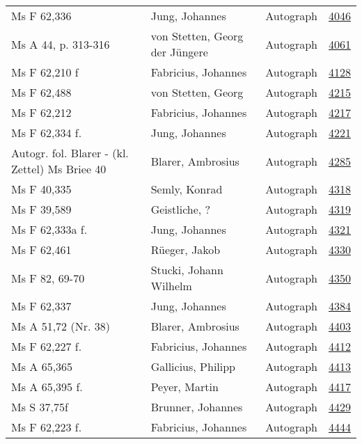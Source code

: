 \documentclass[10pt,a4paper,landscape]{report}
\begin{document}
\begin{longtable}{p{16cm}p{4cm}lr}
Ms F 62,336	&	Jung, Johannes	&	Autograph	&	\href{http://130.60.24.72/assignment/4046}{4046}\\
Ms A 44, p. 313-316	&	von Stetten, Georg der Jüngere	&	Autograph	&	\href{http://130.60.24.72/assignment/4061}{4061}\\
Ms F 62,210 f	&	Fabricius, Johannes	&	Autograph	&	\href{http://130.60.24.72/assignment/4128}{4128}\\
Ms F 62,488	&	von Stetten, Georg	&	Autograph	&	\href{http://130.60.24.72/assignment/4215}{4215}\\
Ms F 62,212	&	Fabricius, Johannes	&	Autograph	&	\href{http://130.60.24.72/assignment/4217}{4217}\\
Ms F 62,334 f.	&	Jung, Johannes	&	Autograph	&	\href{http://130.60.24.72/assignment/4221}{4221}\\
Autogr. fol. Blarer - (kl. Zettel) Ms Briee 40	&	Blarer, Ambrosius	&	Autograph	&	\href{http://130.60.24.72/assignment/4285}{4285}\\
Ms F 40,335	&	Semly, Konrad	&	Autograph	&	\href{http://130.60.24.72/assignment/4318}{4318}\\
Ms F 39,589	&	Geistliche, ?	&	Autograph	&	\href{http://130.60.24.72/assignment/4319}{4319}\\
Ms F 62,333a f.	&	Jung, Johannes	&	Autograph	&	\href{http://130.60.24.72/assignment/4321}{4321}\\
Ms F 62,461	&	Rüeger, Jakob	&	Autograph	&	\href{http://130.60.24.72/assignment/4330}{4330}\\
Ms F 82, 69-70	&	Stucki, Johann Wilhelm	&	Autograph	&	\href{http://130.60.24.72/assignment/4350}{4350}\\
Ms F 62,337	&	Jung, Johannes	&	Autograph	&	\href{http://130.60.24.72/assignment/4384}{4384}\\
Ms A 51,72 (Nr. 38)	&	Blarer, Ambrosius	&	Autograph	&	\href{http://130.60.24.72/assignment/4403}{4403}\\
Ms F 62,227 f.	&	Fabricius, Johannes	&	Autograph	&	\href{http://130.60.24.72/assignment/4412}{4412}\\
Ms A 65,365	&	Gallicius, Philipp	&	Autograph	&	\href{http://130.60.24.72/assignment/4413}{4413}\\
Ms A 65,395 f.	&	Peyer, Martin	&	Autograph	&	\href{http://130.60.24.72/assignment/4417}{4417}\\
Ms S 37,75f	&	Brunner, Johannes	&	Autograph	&	\href{http://130.60.24.72/assignment/4429}{4429}\\
Ms F 62,223 f.	&	Fabricius, Johannes	&	Autograph	&	\href{http://130.60.24.72/assignment/4444}{4444}\\

\end{longtable}
\end{document}
